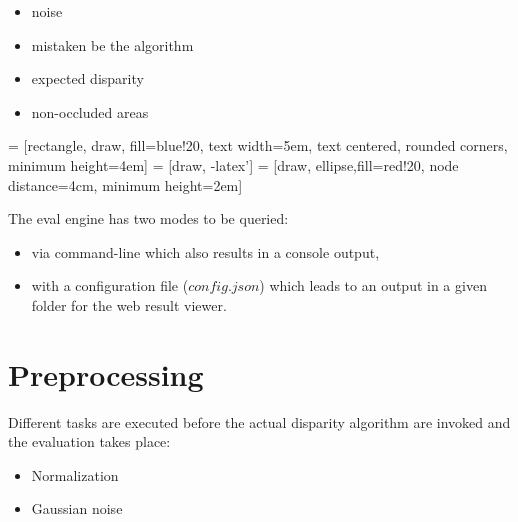 \begin{itemize}
  \item noise
  \item mistaken be the algorithm
  \item expected disparity
  \item non-occluded areas
\end{itemize}

 = [rectangle, draw, fill=blue!20,
    text width=5em, text centered, rounded corners, minimum height=4em]
 = [draw, -latex']
 = [draw, ellipse,fill=red!20, node distance=4cm,
    minimum height=2em]

\begin{center}
\end{center}

The eval engine has two modes to be queried:

\begin{itemize}
  \item via command-line which also results in a console output,
  \item with a configuration file ($config.json$) which leads to an output in a given folder for the web result viewer.
\end{itemize}

\section{Preprocessing}

Different tasks are executed before the actual disparity algorithm are invoked and the evaluation takes place:

\begin{itemize}
  \item Normalization
  \item Gaussian noise
\end{itemize}

